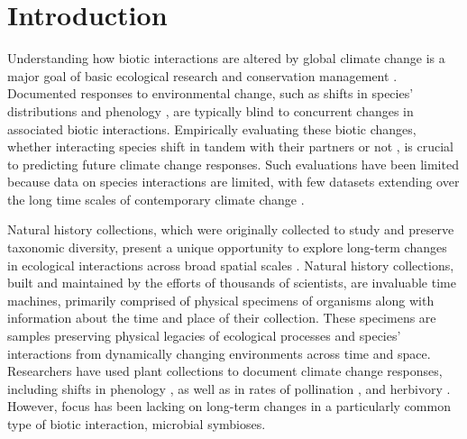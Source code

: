 \documentclass[11pt]{article}
\let\cite\citep
\begin{document}
	\newpage{}
	
	\section*{Introduction}
	
	
Understanding how biotic interactions are altered by global climate change is a major goal of basic ecological research and conservation management \cite{gilman2010framework,blois2013climate}.
Documented responses to environmental change, such as shifts in species' distributions \cite{aitken2008adaptation} and phenology \cite{piao2019plant}, are typically blind to concurrent changes in associated biotic interactions.
Empirically evaluating these biotic changes, whether interacting species shift in tandem with their partners or not \cite{hillerislambers2013will}, is crucial to predicting future climate change responses. 
Such evaluations have been limited because data on species interactions are limited, with few datasets extending over the long time scales of contemporary climate change \cite{poisot2021global}.


Natural history collections, which were originally collected to study and preserve taxonomic diversity, present a unique opportunity to explore long-term changes in ecological interactions across broad spatial scales \citep{meineke2018unrealized}. 
Natural history collections, built and maintained by the efforts of thousands of scientists, are invaluable time machines, primarily comprised of physical specimens of organisms  along with information about the time and place of their collection. 
These specimens are samples preserving physical legacies of ecological processes and species' interactions from dynamically changing environments across time and space.
Researchers have used plant collections to document climate change responses, including shifts in phenology \citep{willis2017old, park2019herbarium,  berg2019examination}, as well as in rates of pollination \citep{pauw2011reconstruction, duan2019century}, and herbivory \citep{meineke2019herbarium}. 
However, focus has been lacking on long-term changes in a particularly common type of biotic interaction, microbial symbioses.
\end{document}
